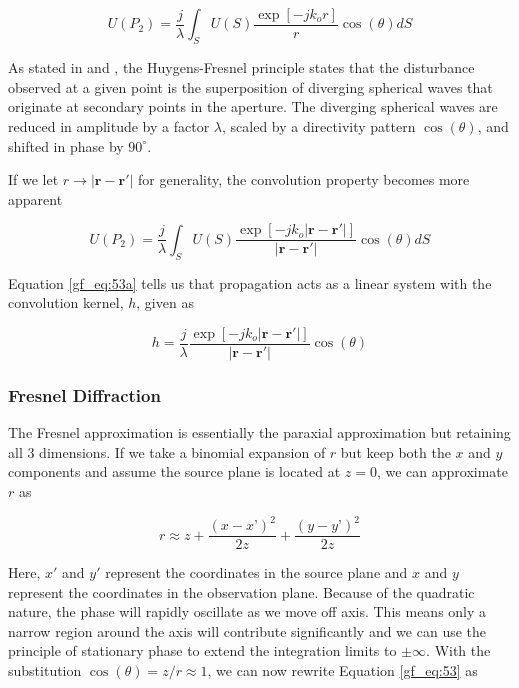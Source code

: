 \begin{equation}
\boxed{U(P_2) =\frac{j}{\lambda}\int_S U(S)\frac{\exp\left[-jk_o r\right]}{r}\cos(\theta)dS}
\label{gf_eq:53}
\end{equation}
\renewcommand{\baselinestretch}{2} \small\normalsize

As stated in \cite{goodman_fourier} and \cite{gaskill_fourier}, the Huygens-Fresnel principle states that the disturbance observed at a given point is the superposition of diverging spherical waves that originate at secondary points in the aperture. The diverging spherical waves are reduced in amplitude by a factor $\lambda$, scaled by a directivity pattern $\cos(\theta)$, and shifted in phase by $90^{\circ}$.

\noindent If we let $r \rightarrow |\mathbf{r}-\mathbf{r}'|$ for generality, the convolution property becomes more apparent

\begin{equation}
U(P_2) =\frac{j}{\lambda}\int_S U(S)\frac{\exp\left[-jk_o |\mathbf{r}-\mathbf{r}'|\right]}{|\mathbf{r}-\mathbf{r}'|}\cos(\theta)dS
\label{gf_eq:53a}
\end{equation}
\renewcommand{\baselinestretch}{2} \small\normalsize

Equation \ref{gf_eq:53a} tells us that propagation acts as a linear system with the convolution kernel, $h$, given as

\begin{equation}
h=\frac{j}{\lambda}\frac{\exp\left[-jk_o |\mathbf{r}-\mathbf{r}'|\right]}{|\mathbf{r}-\mathbf{r}'|}\cos(\theta)
\label{gf_eq:53b}
\end{equation}
\renewcommand{\baselinestretch}{2} \small\normalsize

\subsubsection{Fresnel Diffraction}
The Fresnel approximation is essentially the paraxial approximation but retaining all 3 dimensions. If we take a binomial expansion of $r$ but keep both the $x$ and $y$ components and assume the source plane is located at $z=0$, we can approximate $r$ as

\begin{equation}
r\approx z + \frac{(x-x’)^2}{2z}+\frac{(y-y’)^2}{2z}
\label{gf_eq:53c}
\end{equation}
\renewcommand{\baselinestretch}{2} \small\normalsize

Here, $x'$ and $y'$ represent the coordinates in the source plane and $x$ and $y$ represent the coordinates in the observation plane. Because of the quadratic nature, the phase will rapidly oscillate as we move off axis. This means only a narrow region around the axis will contribute significantly and we can use the principle of stationary phase \cite{gbur_math} to extend the integration limits to $\pm \infty$. With the substitution $\cos(\theta) = z/r \approx 1$, we can now rewrite Equation \ref{gf_eq:53} as

